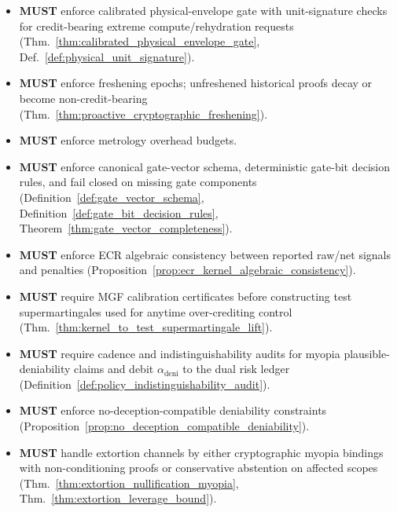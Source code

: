 \documentclass[11pt]{article}
\theoremstyle{definition}
\theoremstyle{plain}
\newcommand{\MUST}{\textbf{MUST}}
\begin{document}
\begin{itemize}[leftmargin=*]
  \item \MUST{} enforce calibrated physical-envelope gate with unit-signature checks for credit-bearing extreme compute/rehydration requests (Thm.~\ref{thm:calibrated_physical_envelope_gate}, Def.~\ref{def:physical_unit_signature}).
  \item \MUST{} enforce freshening epochs; unfreshened historical proofs decay or become non-credit-bearing (Thm.~\ref{thm:proactive_cryptographic_freshening}).
  \item \MUST{} enforce metrology overhead budgets.
  \item \MUST{} enforce canonical gate-vector schema, deterministic gate-bit decision rules, and fail closed on missing gate components (Definition~\ref{def:gate_vector_schema}, Definition~\ref{def:gate_bit_decision_rules}, Theorem~\ref{thm:gate_vector_completeness}).
  \item \MUST{} enforce ECR algebraic consistency between reported raw/net signals and penalties (Proposition~\ref{prop:ecr_kernel_algebraic_consistency}).
  \item \MUST{} require MGF calibration certificates before constructing test supermartingales used for anytime over-crediting control (Thm.~\ref{thm:kernel_to_test_supermartingale_lift}).
  \item \MUST{} require cadence and indistinguishability audits for myopia plausible-deniability claims and debit $\alpha_{\mathrm{deni}}$ to the dual risk ledger (Definition~\ref{def:policy_indistinguishability_audit}).
  \item \MUST{} enforce no-deception-compatible deniability constraints (Proposition~\ref{prop:no_deception_compatible_deniability}).
  \item \MUST{} handle extortion channels by either cryptographic myopia bindings with non-conditioning proofs or conservative abstention on affected scopes (Thm.~\ref{thm:extortion_nullification_myopia}, Thm.~\ref{thm:extortion_leverage_bound}).
\end{itemize}
\end{document}

